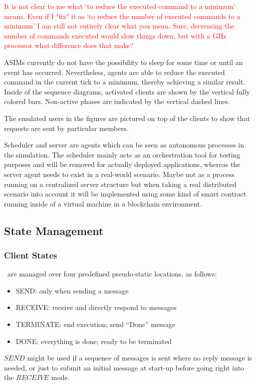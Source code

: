 \textcolor{red}{It is not clear to me what `to reduce the executed command to a minimum' means. Even if I "fix" it as `to reduce the number of executed commands to a minimum' I am still not entirely clear what you mean. Sure, decreasing the number of commands executed would slow things down, but with a GHz processor what difference does that make?}

ASIMs currently do not have the possibility to sleep for some time or until an event has occurred. Nevertheless, agents are able to reduce the executed command in the current tick to a minimum, thereby achieving a similar result. Inside of the sequence diagrams, activated clients are shown by the vertical fully colored bars. Non-active phases are indicated by the vertical dashed lines.

The emulated users in the figures are pictured on top of the clients to show that requests are sent by particular members.

Scheduler and server are agents which can be seen as autonomous processes in the simulation. The scheduler mainly acts as an orchestration tool for testing purposes and will be removed for actually deployed applications, whereas the server agent needs to exist in a real-world scenario. Maybe not as a process running on a centralized server structure but when taking a real distributed scenario into account it will be implemented using some kind of smart contract running inside of a virtual machine in a blockchain environment.

\subsection{State Management}
\label{subsec:impl-states}

\subsubsection{Client States}\ are managed over four predefined pseudo-static locations, as follows:
\begin{itemize}
	\item SEND: only when sending a message
	\item RECEIVE: receive and directly respond to messages
	\item TERMINATE: end execution; send ``Done'' message
	\item DONE: everything is done; ready to be terminated
\end{itemize}
$SEND$ might be used if a sequence of messages is sent where no reply message is needed, or just to submit an initial message at start-up before going right into the $RECEIVE$ mode.

